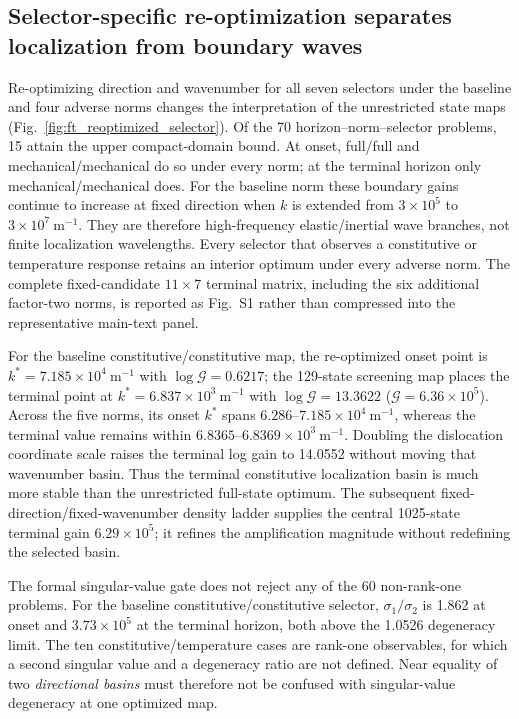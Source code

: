 \subsection{Selector-specific re-optimization separates localization from boundary waves}

Re-optimizing direction and wavenumber for all seven selectors under the
baseline and four adverse norms changes the interpretation of the unrestricted
state maps (Fig.~\ref{fig:ft_reoptimized_selector}).  Of the 70 horizon--norm--selector
problems, 15 attain the upper compact-domain bound.  At onset, full/full and
mechanical/mechanical do so under every norm; at the terminal horizon only
mechanical/mechanical does.  For the baseline norm these boundary gains
continue to increase at fixed direction when $k$ is extended from
$3\times10^5$ to $3\times10^7~\mathrm{m^{-1}}$.  They are therefore
high-frequency elastic/inertial wave branches, not finite localization
wavelengths.  Every selector that observes a constitutive or temperature
response retains an interior optimum under every adverse norm.
The complete fixed-candidate $11\times7$ terminal matrix, including the six
additional factor-two norms, is reported as Fig.~S1 rather than compressed
into the representative main-text panel.

For the baseline constitutive/constitutive map, the re-optimized onset point is
$k^*=7.185\times10^4~\mathrm{m^{-1}}$ with $\log\mathcal G=0.6217$; the
129-state screening map places the terminal point at
$k^*=6.837\times10^3~\mathrm{m^{-1}}$ with
$\log\mathcal G=13.3622$ ($\mathcal G=6.36\times10^5$).  Across the five
norms, its onset $k^*$ spans $6.286$--$7.185\times10^4~\mathrm{m^{-1}}$,
whereas the terminal value remains within
$6.8365$--$6.8369\times10^3~\mathrm{m^{-1}}$.  Doubling the dislocation
coordinate scale raises the terminal log gain to 14.0552 without moving that
wavenumber basin.  Thus the terminal constitutive localization basin is much
more stable than the unrestricted full-state optimum.  The subsequent
fixed-direction/fixed-wavenumber density ladder supplies the central
1025-state terminal gain $6.29\times10^5$; it refines the amplification
magnitude without redefining the selected basin.

The formal singular-value gate does not reject any of the 60 non-rank-one
problems.  For the baseline constitutive/constitutive selector,
$\sigma_1/\sigma_2$ is 1.862 at onset and $3.73\times10^5$ at the terminal
horizon, both above the 1.0526 degeneracy limit.  The ten
constitutive/temperature cases are rank-one observables, for which a second
singular value and a degeneracy ratio are not defined.  Near equality of two
\emph{directional basins} must therefore not be confused with singular-value
degeneracy at one optimized map.

